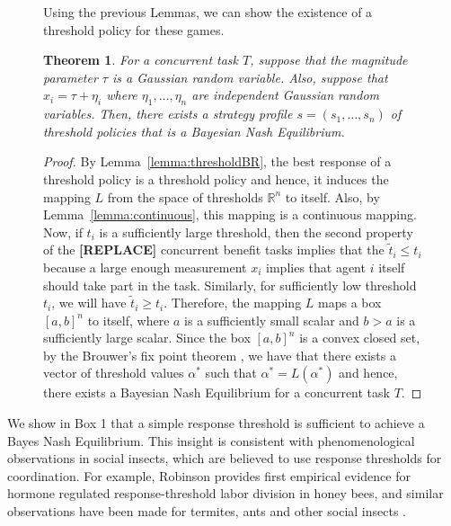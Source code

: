 \documentclass{nature}
\newtheorem{theorem}{Theorem}
\def\R{\mathbb{R}}    %
\begin{document}
\begin{figure}
\begin{framed}
Using the previous Lemmas, we can show the existence of a threshold policy for these games. 
\begin{theorem}\label{thrm:mainthrm}
For a concurrent task $T$, suppose that the magnitude parameter $\tau$ is a Gaussian random variable. Also, suppose that $x_i=\tau+\eta_i$ where $\eta_1,\ldots,\eta_n$ are independent Gaussian random variables. Then, there exists a strategy profile $s=(s_1,\ldots,s_n)$ of threshold policies that is a Bayesian Nash Equilibrium.
\end{theorem}
\begin{proof}
By Lemma~\ref{lemma:thresholdBR}, the best response of a threshold policy is a threshold policy and hence, it induces the mapping $L$ from the space of thresholds $\R^n$ to itself. Also, by Lemma~\ref{lemma:continuous}, this mapping is a continuous mapping. Now, if $t_i$ is a sufficiently large threshold, then the second property of the \textbf{[REPLACE]} concurrent benefit tasks implies that the $\tilde{t}_i\leq t_i$ because a large enough measurement $x_i$ implies that agent $i$ itself should take part in the task. Similarly, for sufficiently low threshold $t_i$, we will have $\tilde{t}_i\geq t_i$. Therefore, the mapping $L$ maps a box $[a,b]^n$ to itself, where $a$ is a sufficiently small scalar and $b>a$ is a sufficiently large scalar. Since the box $[a,b]^n$ is a convex closed set, by the Brouwer's fix point theorem \cite{border1990fixed}, we have that there exists a vector of threshold values $\alpha^*$ such that $\alpha^*=L(\alpha^*)$ and hence, there exists a Bayesian Nash Equilibrium for a concurrent task $T$.
\end{proof}
\end{framed}
\end{figure}

\linenumbers
We show in Box 1 that a simple response threshold is sufficient to achieve a Bayes Nash Equilibrium. This insight is consistent with phenomenological observations in social insects, which are believed to use response thresholds for coordination. For example, Robinson\cite{Robinson1987} provides first empirical evidence for hormone regulated response-threshold labor division in honey bees, and similar observations have been made for termites, ants and other social insects \cite{bonabeau1999swarm,camazineprinceton}.

\end{document}
